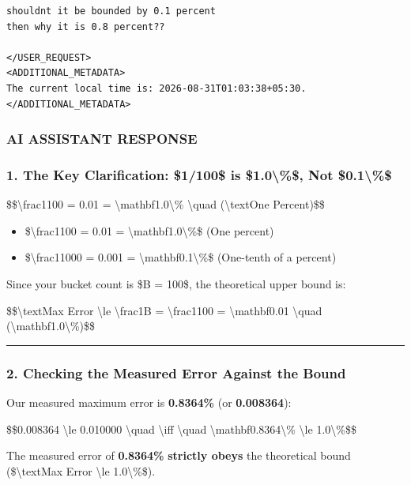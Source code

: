 \documentclass[11pt,a4paper]{article}
\begin{document}
{\begin{lstlisting}[language=text]
shouldnt it be bounded by 0.1 percent 
then why it is 0.8 percent??

</USER_REQUEST>
<ADDITIONAL_METADATA>
The current local time is: 2026-08-31T01:03:38+05:30.
</ADDITIONAL_METADATA>
\end{lstlisting}


\subsubsection{AI ASSISTANT RESPONSE}

\subsubsection{1. The Key Clarification: \$1/100\$ is \textbf{\$1.0\textbackslash{}\%\$}, Not \$0.1\textbackslash{}\%\$}

\$\$\textbackslash{}frac{1}{100} = 0.01 = \textbackslash{}mathbf{1.0\textbackslash{}\%} \textbackslash{}quad (\textbackslash{}text{One Percent})\$\$


\begin{itemize}
\item \$\textbackslash{}frac{1}{100} = 0.01 = \textbackslash{}mathbf{1.0\textbackslash{}\%}\$ (One percent)
\item \$\textbackslash{}frac{1}{1000} = 0.001 = \textbackslash{}mathbf{0.1\textbackslash{}\%}\$ (One-tenth of a percent)
\end{itemize}

Since your bucket count is \$B = 100\$, the theoretical upper bound is:


\$\$\textbackslash{}text{Max Error} \textbackslash{}le \textbackslash{}frac{1}{B} = \textbackslash{}frac{1}{100} = \textbackslash{}mathbf{0.01} \textbackslash{}quad (\textbackslash{}mathbf{1.0\textbackslash{}\%})\$\$


\hrule


\subsubsection{2. Checking the Measured Error Against the Bound}

Our measured maximum error is \textbf{0.8364\%} (or \textbf{0.008364}):


\$\$0.008364 \textbackslash{}le 0.010000 \textbackslash{}quad \textbackslash{}iff \textbackslash{}quad \textbackslash{}mathbf{0.8364\textbackslash{}\% \textbackslash{}le 1.0\textbackslash{}\%}\$\$


The measured error of \textbf{0.8364\%} \textbf{strictly obeys} the theoretical bound (\$\textbackslash{}text{Max Error} \textbackslash{}le 1.0\textbackslash{}\%\$).


}
\end{document}

